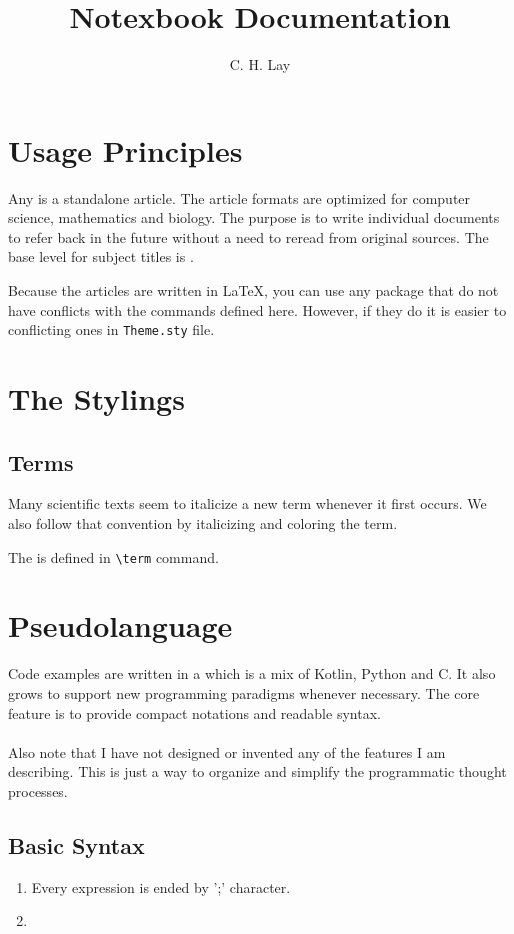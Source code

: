 \documentclass{book}
\title{Notexbook Documentation}
\author{C. H. Lay}
\begin{document}
\maketitle
\tableofcontents

\chapter{Usage Principles}
Any  is a standalone article.
The article formats are optimized for computer science, mathematics and biology.
The purpose is to write individual documents to refer back in the future without
a need to reread from original sources. The base level for subject titles is .

Because the articles are written in \LaTeX, you can use any package 
that do not have conflicts with the commands defined here.
However, if they do it is easier to conflicting ones in \verb|Theme.sty| file.

\chapter{The Stylings}
\section{Terms}
Many scientific texts seem to italicize a new term whenever it first occurs.
We also follow that convention by italicizing and coloring the term.

\begin{example}
The  is defined in \verb|\term| command.
\end{example}

\chapter{Pseudolanguage}
Code examples are written in a  which is a mix of Kotlin, Python and C.
It also grows to support new programming paradigms whenever necessary.
The core feature is to provide compact notations and readable syntax.
\\\\
\noindent
Also note that I have not designed or invented any of the features I am describing.
This is just a way to organize and simplify the programmatic thought processes.

\section{Basic Syntax}
\begin{enumerate}
    \item Every expression is ended by ';' character.
    \item 
\end{enumerate}
\end{document}
